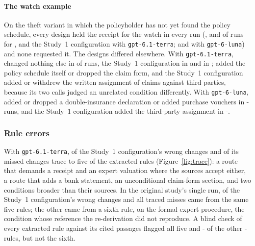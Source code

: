 \paragraph{The watch example}
On the theft variant in which the policyholder has not yet found the policy schedule, every design held the receipt for the watch in every run (\watchTerraDHeld, \watchTerraRHeld{} and \watchTerraCPHeld{} of \watchTerraRRuns{} runs for ,  and the Study~1 configuration with \texttt{gpt-6.1-terra}; \watchLunaRHeld{} and \watchLunaCPHeld{} with \texttt{gpt-6-luna}) and none requested it. The designs differed elsewhere. With \texttt{gpt-6.1-terra},  changed nothing else in \watchTerraRStable{} of \watchTerraRRuns{} runs, the Study~1 configuration in \watchTerraCPStable{} and  in \watchTerraDStable;  added the policy schedule itself or dropped the claim form, and the Study~1 configuration added or withdrew the written assignment of claims against third parties, because its two calls judged an unrelated condition differently. With \texttt{gpt-6-luna},  added or dropped a double-insurance declaration or added purchase vouchers in \the\numexpr\watchLunaRRuns-\watchLunaRStable\relax{} runs, and the Study~1 configuration added the third-party assignment in \the\numexpr\watchLunaCPRuns-\watchLunaCPStable\relax.

\subsubsection{Rule errors}
\label{sec:results-rules}

With \texttt{gpt-6.1-terra}, \ecWrongFaulty{} of the Study~1 configuration's \thTerraCPWrong{} wrong changes and \ecMissedFaulty{} of its \thTerraCPMissed{} missed changes trace to five of the \rvRules{} extracted rules (Figure~\ref{fig:trace}): a route that demands a receipt and an expert valuation where the sources accept either, a route that adds a bank statement, an unconditional claim-form section, and two conditions broader than their sources. In the original study's single run, \origTraceWrongFive{} of the Study~1 configuration's \origTraceWrong{} wrong changes and all \origTraceMissed{} traced misses came from the same five rules; the other \origTraceWrongRuleTwentyThree{} came from a sixth rule, on the formal expert procedure, the condition whose reference the re-derivation did not reproduce. A blind check of every extracted rule against its cited passages flagged all five and \the\numexpr\rvFlagged-\rvImplicatedFlagged\relax{} of the other \the\numexpr\rvRules-\rvImplicated\relax{} rules, but not the sixth.

